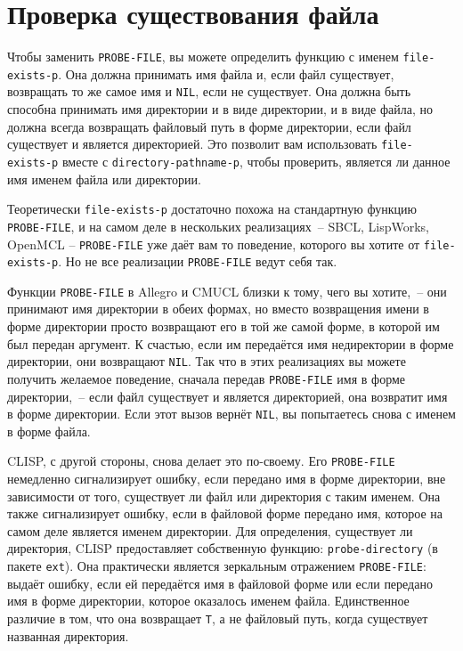 \section{Проверка существования файла}

Чтобы заменить \lstinline{PROBE-FILE}, вы можете определить функцию с именем
\lstinline{file-exists-p}. Она должна принимать имя файла и, если файл существует, возвращать
то же самое имя и \lstinline{NIL}, если не существует. Она должна быть способна принимать имя
директории и в виде директории, и в виде файла, но должна всегда возвращать файловый путь
в форме директории, если файл существует и является директорией. Это позволит вам
использовать \lstinline{file-exists-p} вместе с \lstinline{directory-pathname-p}, чтобы проверить,
является ли данное имя именем файла или директории.

Теоретически \lstinline{file-exists-p} достаточно похожа на стандартную функцию
\lstinline{PROBE-FILE}, и на самом деле в нескольких реализациях~-- SBCL, LispWorks, OpenMCL
– \lstinline{PROBE-FILE} уже даёт вам то поведение, которого вы хотите от
\lstinline{file-exists-p}. Но не все реализации \lstinline{PROBE-FILE} ведут себя так.

Функции \lstinline{PROBE-FILE} в Allegro и CMUCL близки к тому, чего вы хотите,~-- они
принимают имя директории в обеих формах, но вместо возвращения имени в форме директории
просто возвращают его в той же самой форме, в которой им был передан аргумент. К счастью,
если им передаётся имя недиректории в форме директории, они возвращают \lstinline{NIL}. Так
что в этих реализациях вы можете получить желаемое поведение, сначала передав
\lstinline{PROBE-FILE} имя в форме директории,~-- если файл существует и является директорией,
она возвратит имя в форме директории. Если этот вызов вернёт \lstinline{NIL}, вы попытаетесь
снова с именем в форме файла.

CLISP, с другой стороны, снова делает это по-своему. Его \lstinline{PROBE-FILE} немедленно
сигнализирует ошибку, если передано имя в форме директории, вне зависимости от того,
существует ли файл или директория с таким именем. Она также сигнализирует ошибку, если в
файловой форме передано имя, которое на самом деле является именем директории. Для
определения, существует ли директория, CLISP предоставляет собственную функцию:
\lstinline{probe-directory} (в пакете \lstinline{ext}). Она практически является зеркальным
отражением \lstinline{PROBE-FILE}: выдаёт ошибку, если ей передаётся имя в файловой форме или
если передано имя в форме директории, которое оказалось именем файла. Единственное
различие в том, что она возвращает \lstinline{T}, а не файловый путь, когда существует
названная директория.

